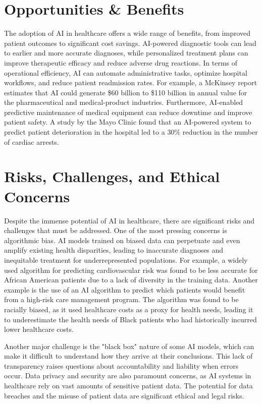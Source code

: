 \section{Opportunities \& Benefits}

The adoption of AI in healthcare offers a wide range of benefits, from improved patient outcomes to significant cost savings. AI-powered diagnostic tools can lead to earlier and more accurate diagnoses, while personalized treatment plans can improve therapeutic efficacy and reduce adverse drug reactions. In terms of operational efficiency, AI can automate administrative tasks, optimize hospital workflows, and reduce patient readmission rates. For example, a McKinsey report estimates that AI could generate \$60 billion to \$110 billion in annual value for the pharmaceutical and medical-product industries. Furthermore, AI-enabled predictive maintenance of medical equipment can reduce downtime and improve patient safety. A study by the Mayo Clinic found that an AI-powered system to predict patient deterioration in the hospital led to a 30\% reduction in the number of cardiac arrests.

\section{Risks, Challenges, and Ethical Concerns}

Despite the immense potential of AI in healthcare, there are significant risks and challenges that must be addressed. One of the most pressing concerns is algorithmic bias. AI models trained on biased data can perpetuate and even amplify existing health disparities, leading to inaccurate diagnoses and inequitable treatment for underrepresented populations. For example, a widely used algorithm for predicting cardiovascular risk was found to be less accurate for African American patients due to a lack of diversity in the training data. Another example is the use of an AI algorithm to predict which patients would benefit from a high-risk care management program. The algorithm was found to be racially biased, as it used healthcare costs as a proxy for health needs, leading it to underestimate the health needs of Black patients who had historically incurred lower healthcare costs.

Another major challenge is the "black box" nature of some AI models, which can make it difficult to understand how they arrive at their conclusions. This lack of transparency raises questions about accountability and liability when errors occur. Data privacy and security are also paramount concerns, as AI systems in healthcare rely on vast amounts of sensitive patient data. The potential for data breaches and the misuse of patient data are significant ethical and legal risks.

